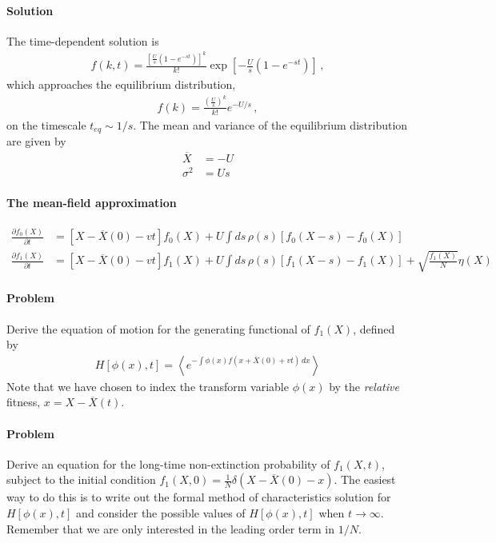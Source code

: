 \documentclass[11pt]{article}
\begin{document}
\paragraph{Solution} 
The time-dependent solution is
\begin{align}
f(k,t) = \frac{\left[ \frac{U}{s} \left( 1 - e^{-st} \right) \right]^k}{k!} \exp \left[ - \frac{U}{s} \left( 1 - e^{-st} \right) \right] \, ,
\end{align}
which approaches the equilibrium distribution,
\begin{align}
f(k) = \frac{\left(\frac{U}{s}\right)^k}{k!} e^{-U/s} \, ,
\end{align}
on the timescale $t_{eq} \sim 1/s$. The mean and variance of the equilibrium distribution are given by
\begin{align}
\overline{X} & = - U \\
\sigma^2 & = U s 
\end{align}

\paragraph{The mean-field approximation} 

\begin{align}
\frac{\partial f_0(X)}{\partial t} & = \left[ X-\overline{X}(0)-vt \right] f_0(X) + U \int ds \, \rho(s) \left[ f_0(X-s) - f_0(X) \right] \\
\frac{\partial f_1(X)}{\partial t} & = \left[ X - \overline{X}(0) - vt \right] f_1(X) + U \int ds \, \rho(s) \left[ f_1(X-s) - f_1(X) \right] + \sqrt{\frac{f_1(X)}{N}} \eta(X)  
\end{align}

\paragraph{Problem} Derive the equation of motion for the generating functional of $f_1(X)$, defined by
\begin{align}
H[\phi(x),t] = \left\langle e^{-\int \phi(x) f(x+\overline{X}(0)+vt) \, dx } \right\rangle
\end{align}
Note that we have chosen to index the transform variable $\phi(x)$ by the \emph{relative} fitness, $x = X-\overline{X}(t)$. 

\paragraph{Problem} Derive an equation for the long-time non-extinction probability of $f_1(X,t)$, subject to the initial condition $f_1(X,0) = \frac{1}{N} \delta(X-\overline{X}(0)-x)$. The easiest way to do this is to write out the formal method of characteristics solution for $H[\phi(x),t]$ and consider the possible values of $H[\phi(x),t]$ when $t \to \infty$. Remember that we are only interested in the leading order term in $1/N$.    
\end{document}
